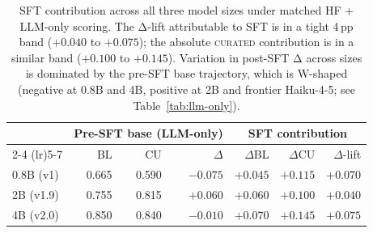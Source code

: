 \documentclass[10pt]{article}
\newcommand{\CU}{\textsc{curated}\xspace}
\begin{document}
\begin{table}[h]
\centering
\small
\begin{tabular}{@{}l rrr rrr@{}}
\toprule
& \multicolumn{3}{c}{\textbf{Pre-SFT base (LLM-only)}} & \multicolumn{3}{c}{\textbf{SFT contribution}} \\
\cmidrule(lr){2-4} \cmidrule(lr){5-7}
& BL & CU & $\Delta$ & $\Delta$BL & $\Delta$CU & $\Delta$-lift \\
\midrule
0.8B (v1)   & 0.665 & 0.590 & $-0.075$ & $+0.045$ & $+0.115$ & $\boldsymbol{+0.070}$ \\
2B (v1.9)   & 0.755 & 0.815 & $+0.060$ & $+0.060$ & $+0.100$ & $\boldsymbol{+0.040}$ \\
4B (v2.0)   & 0.850 & 0.840 & $-0.010$ & $+0.070$ & $+0.145$ & $\boldsymbol{+0.075}$ \\
\bottomrule
\end{tabular}
\caption{SFT contribution across all three model sizes under matched HF + LLM-only scoring. The Δ-lift attributable to SFT is in a tight 4\,pp band ($+0.040$ to $+0.075$); the absolute \CU{} contribution is in a similar band ($+0.100$ to $+0.145$). Variation in post-SFT Δ across sizes is dominated by the pre-SFT base trajectory, which is W-shaped (negative at 0.8B and 4B, positive at 2B and frontier Haiku-4-5; see Table~\ref{tab:llm-only}).}
\label{tab:sft-contribution}
\end{table}
\end{document}
